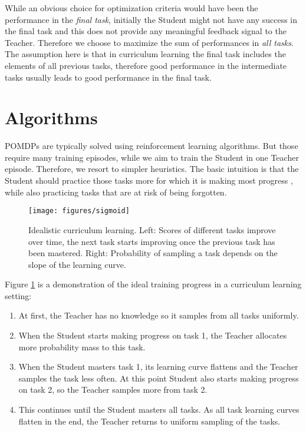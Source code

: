 \documentclass{article}
\begin{document}
While an obvious choice for optimization criteria would have been the performance in the \textit{final task}, initially the Student might not have any success in the final task and this does not provide any meaningful feedback signal to the Teacher. Therefore we choose to maximize the sum of performances in \textit{all tasks}. The assumption here is that in curriculum learning the final task includes the elements of all previous tasks, therefore good performance in the intermediate tasks usually leads to good performance in the final task.

\section{Algorithms}

POMDPs are typically solved using reinforcement learning algorithms. But those require many training episodes, while we aim to train the Student in one Teacher episode. Therefore, we resort to simpler heuristics. The basic intuition is that the Student should practice those tasks more for which it is making most progress \citep{Oudeyer2007}, while also practicing tasks that are at risk of being forgotten.

\begin{figure}[h]
  \texttt{[image: figures/sigmoid]}
\caption{Idealistic curriculum learning. Left: Scores of different tasks improve over time, the next task starts improving once the previous task has been mastered. Right: Probability of sampling a task depends on the slope of the learning curve.}
\label{f2}
\end{figure}

Figure \ref{f2} is a demonstration of the ideal training progress in a curriculum learning setting:
\begin{enumerate}
\item  At first, the Teacher has no knowledge so it samples from all tasks uniformly.

\item  When the Student starts making progress on task 1, the Teacher allocates more probability mass to this task.

\item  When the Student masters task 1, its learning curve flattens and the Teacher samples the task less often. At this point Student also starts making progress on task 2, so the Teacher samples more from task 2.

\item  This continues until the Student masters all tasks. As all task learning curves flatten in the end, the Teacher returns to uniform sampling of the tasks.
\end{enumerate}
\end{document}
